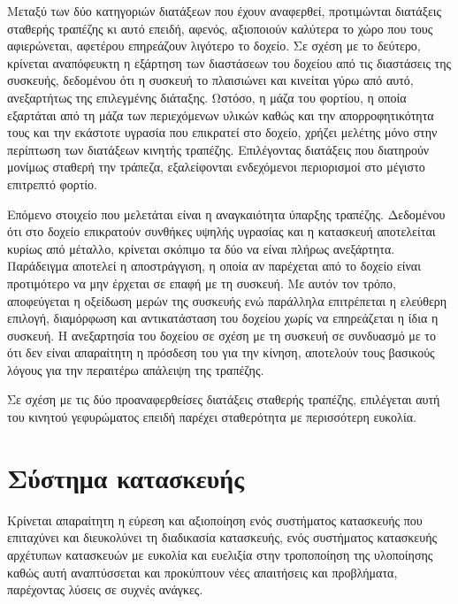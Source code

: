 Μεταξύ των δύο κατηγοριών διατάξεων που έχουν αναφερθεί, προτιμώνται διατάξεις
σταθερής τραπέζης κι αυτό επειδή, αφενός, αξιοποιούν καλύτερα το χώρο που τους
αφιερώνεται, αφετέρου επηρεάζουν λιγότερο το δοχείο.
Σε σχέση με το δεύτερο, κρίνεται αναπόφευκτη η εξάρτηση των διαστάσεων του
δοχείου από τις διαστάσεις της συσκευής, δεδομένου ότι η συσκευή το πλαισιώνει
και κινείται γύρω από αυτό, ανεξαρτήτως της επιλεγμένης διάταξης. Ωστόσο, η μάζα
του φορτίου, η οποία εξαρτάται από τη μάζα των περιεχόμενων υλικών καθώς και την
απορροφητικότητα τους και την εκάστοτε υγρασία που επικρατεί στο δοχείο, χρήζει
μελέτης μόνο στην περίπτωση των διατάξεων κινητής τραπέζης. Επιλέγοντας
διατάξεις που διατηρούν μονίμως σταθερή την τράπεζα, εξαλείφονται ενδεχόμενοι
περιορισμοί στο μέγιστο επιτρεπτό φορτίο.
%
%
%

Επόμενο στοιχείο που μελετάται είναι η αναγκαιότητα ύπαρξης τραπέζης. Δεδομένου
ότι στο δοχείο επικρατούν συνθήκες υψηλής υγρασίας και η κατασκευή αποτελείται
κυρίως από μέταλλο, κρίνεται σκόπιμο τα δύο να είναι πλήρως ανεξάρτητα.
Παράδειγμα αποτελεί η αποστράγγιση, η οποία αν παρέχεται από το δοχείο είναι
προτιμότερο να μην έρχεται σε επαφή με τη συσκευή.
Με αυτόν τον τρόπο, αποφεύγεται η οξείδωση μερών της συσκευής ενώ παράλληλα
επιτρέπεται η ελεύθερη επιλογή, διαμόρφωση και αντικατάσταση του δοχείου χωρίς
να επηρεάζεται η ίδια η συσκευή.
Η ανεξαρτησία του δοχείου σε σχέση με τη συσκευή σε συνδυασμό με το ότι δεν
είναι απαραίτητη η πρόσδεση του για την κίνηση, αποτελούν τους βασικούς λόγους
για την περαιτέρω απάλειψη της τραπέζης.

Σε σχέση με τις δύο προαναφερθείσες διατάξεις σταθερής τραπέζης, επιλέγεται αυτή
του κινητού γεφυρώματος επειδή παρέχει σταθερότητα με περισσότερη ευκολία.

\section{Σύστημα κατασκευής}

Κρίνεται απαραίτητη η εύρεση και αξιοποίηση ενός συστήματος κατασκευής που
επιταχύνει και διευκολύνει τη διαδικασία κατασκευής, ενός συστήματος κατασκευής
αρχέτυπων κατασκευών με ευκολία και ευελιξία στην τροποποίηση της υλοποίησης
καθώς αυτή αναπτύσσεται και προκύπτουν νέες απαιτήσεις και προβλήματα,
παρέχοντας λύσεις σε συχνές ανάγκες.

